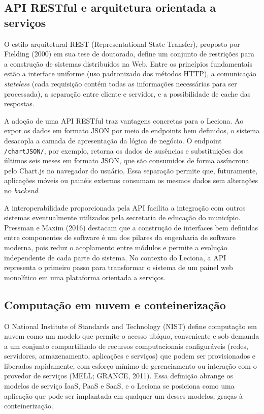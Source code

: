 \subsection{API RESTful e arquitetura orientada a serviços}

O estilo arquitetural REST (Representational State Transfer), proposto por Fielding (2000) em sua tese de doutorado, define um conjunto de restrições para a construção de sistemas distribuídos na Web. Entre os princípios fundamentais estão a interface uniforme (uso padronizado dos métodos HTTP), a comunicação \textit{stateless} (cada requisição contém todas as informações necessárias para ser processada), a separação entre cliente e servidor, e a possibilidade de cache das respostas.

A adoção de uma API RESTful traz vantagens concretas para o Leciona. Ao expor os dados em formato JSON por meio de endpoints bem definidos, o sistema desacopla a camada de apresentação da lógica de negócio. O endpoint \texttt{/chartJSON/}, por exemplo, retorna os dados de ausências e substituições dos últimos seis meses em formato JSON, que são consumidos de forma assíncrona pelo Chart.js no navegador do usuário. Essa separação permite que, futuramente, aplicações móveis ou painéis externos consumam os mesmos dados sem alterações no \textit{backend}.

A interoperabilidade proporcionada pela API facilita a integração com outros sistemas eventualmente utilizados pela secretaria de educação do município. Pressman e Maxim (2016) destacam que a construção de interfaces bem definidas entre componentes de software é um dos pilares da engenharia de software moderna, pois reduz o acoplamento entre módulos e permite a evolução independente de cada parte do sistema. No contexto do Leciona, a API representa o primeiro passo para transformar o sistema de um painel web monolítico em uma plataforma orientada a serviços.

\subsection{Computação em nuvem e conteinerização}

O National Institute of Standards and Technology (NIST) define computação em nuvem como um modelo que permite o acesso ubíquo, conveniente e sob demanda a um conjunto compartilhado de recursos computacionais configuráveis (redes, servidores, armazenamento, aplicações e serviços) que podem ser provisionados e liberados rapidamente, com esforço mínimo de gerenciamento ou interação com o provedor de serviços (MELL; GRANCE, 2011). Essa definição abrange os modelos de serviço IaaS, PaaS e SaaS, e o Leciona se posiciona como uma aplicação que pode ser implantada em qualquer um desses modelos, graças à conteinerização.

